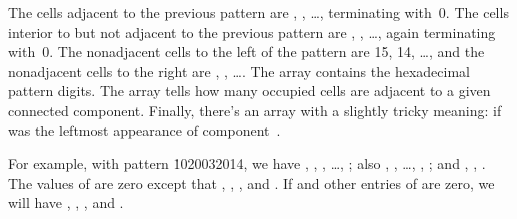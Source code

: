 The cells adjacent to the previous pattern are , ,
\dots, terminating with~0. The cells interior to but not adjacent to
the previous pattern are , , %
\dots, again terminating
with~0. The nonadjacent cells to the left of the pattern are 15, 14, \dots,
and the nonadjacent cells to the right are , , \dots.
The array  contains the hexadecimal pattern digits.
The array  tells how many occupied cells are adjacent to a
given connected component. Finally, there's an array 
with a slightly tricky meaning:  if 
was
the leftmost appearance of component~.

For example, with pattern \.{1020032014}, we have
, , , \dots, ;
also , , %
\dots, , ;
and , , .
The values of  are zero except that ,
, , and .
If  and other entries of  are
zero, we will have , , , and
.


